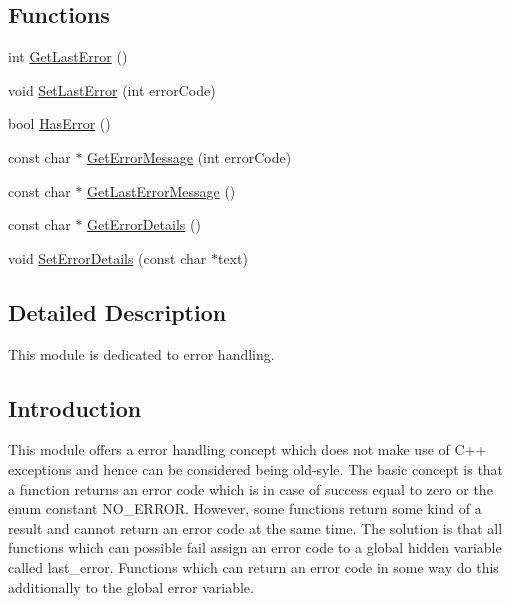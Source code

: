 \subsection*{Functions}
\begin{DoxyCompactItemize}
\item 
int \hyperlink{group__error__group_ga10b9a284527af83a44533867b0aff0fc}{Get\+Last\+Error} ()
\item 
void \hyperlink{group__error__group_ga042670233cf17b3bfb1412a37e7dfd59}{Set\+Last\+Error} (int error\+Code)
\item 
bool \hyperlink{group__error__group_ga9f6d63ccb598465866b249cbd6dd06c7}{Has\+Error} ()
\item 
const char $\ast$ \hyperlink{group__error__group_gac785e42215658e0f7127f3690dd8f788}{Get\+Error\+Message} (int error\+Code)
\item 
const char $\ast$ \hyperlink{group__error__group_gac9be83c8ac2a5d80a2be46487c596eab}{Get\+Last\+Error\+Message} ()
\item 
const char $\ast$ \hyperlink{group__error__group_ga8258f5044a56ed71aeed5633fc8341b6}{Get\+Error\+Details} ()
\item 
void \hyperlink{group__error__group_gac4c413604bb98cf7bb6befe53e748b63}{Set\+Error\+Details} (const char $\ast$text)
\end{DoxyCompactItemize}


\subsection{Detailed Description}
This module is dedicated to error handling. 

\hypertarget{group__error__group_intro_sect}{}\subsection{Introduction}\label{group__error__group_intro_sect}
This module offers a error handling concept which does not make use of C++ exceptions and hence can be considered being old-\/syle. The basic concept is that a function returns an error code which is in case of success equal to zero or the enum constant {\ttfamily N\+O\+\_\+\+E\+R\+R\+OR}. However, some functions return some kind of a result and cannot return an error code at the same time. The solution is that all functions which can possible fail assign an error code to a global hidden variable called {\ttfamily last\+\_\+error}. Functions which can return an error code in some way do this additionally to the global error variable.

